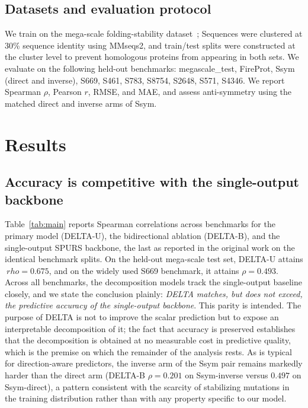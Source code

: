 \documentclass[11pt,a4paper]{article}
\theoremstyle{plain}
\theoremstyle{definition}
\begin{document}
\subsection{Datasets and evaluation protocol}
\label{sec:data}
We train on the mega-scale folding-stability dataset~\cite{tsuboyama2023mega}; Sequences were clustered at 30\% sequence identity using MMseqs2, and train/test splits were constructed at the cluster level to prevent homologous proteins from appearing in both sets. We evaluate on the following held-out benchmarks: megascale\_test, FireProt, Ssym (direct and inverse), S669, S461, S783, S8754, S2648, S571, S4346. We report Spearman $\rho$, Pearson $r$, RMSE, and MAE, and assess
anti-symmetry using the matched direct and inverse arms of Ssym.

\section{Results}


\subsection{Accuracy is competitive with the single-output backbone}
Table~\ref{tab:main} reports Spearman correlations across benchmarks for the primary model (DELTA-U), the bidirectional ablation (DELTA-B), and the single-output SPURS backbone, the last as reported in the original work on the identical benchmark splits. On the held-out mega-scale test set, DELTA-U attains $\ rho = 0.675$, and on the widely used S669 benchmark, it attains $\rho = 0.493$. Across all benchmarks, the decomposition models track the single-output baseline closely, and we state the conclusion plainly: \emph{DELTA matches, but does not exceed, the predictive accuracy
of the single-output backbone}. This parity is intended. The purpose of DELTA is not to improve the scalar prediction but to expose an interpretable decomposition of it; the fact that accuracy is preserved establishes that the decomposition is obtained at no measurable cost in predictive quality, which is the premise on which the remainder of the analysis rests. As is typical for direction-aware predictors, the inverse arm of the Ssym pair remains markedly harder than the direct arm (DELTA-B $\rho = 0.201$ on Ssym-inverse versus $0.497$ on Ssym-direct), a pattern consistent with the scarcity of stabilizing mutations in the training distribution rather than with any property specific to our model.
\end{document}

